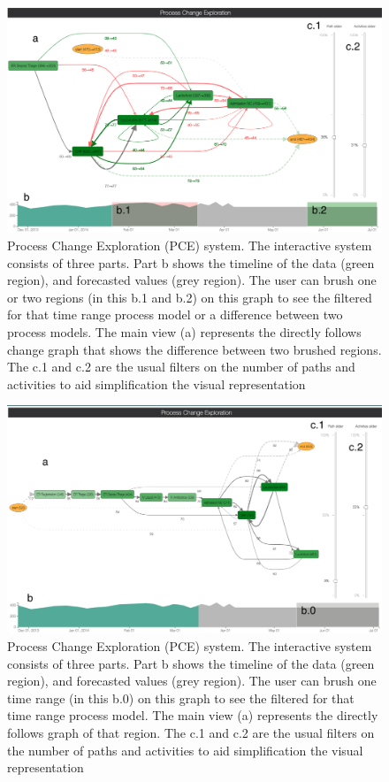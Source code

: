 \begin{figure}
	\centering
	\includegraphics[width=\textwidth]{img/vis/vis-system-two-brushes.png}
	\caption{Process Change Exploration (PCE) system. The interactive system consists of three parts. Part b shows the timeline of the data (green region), and forecasted values (grey region). The user can brush one or two regions (in this b.1 and b.2) on this graph to see the filtered for that time range process model or a difference between two process models. The main view (a) represents the directly follows change graph that shows the difference between two brushed regions. The c.1 and c.2 are the usual filters on the number of paths and activities to aid simplification the visual representation} 
	\label{fig:vis-two-brushes}
\end{figure}

\begin{figure}
	\centering
	\includegraphics[width=\textwidth]{img/vis/vis-system-one-brush.png}
	\caption{Process Change Exploration (PCE) system. The interactive system consists of three parts. Part b shows the timeline of the data (green region), and forecasted values (grey region). The user can brush one time range (in this b.0) on this graph to see the filtered for that time range process model. The main view (a) represents the directly follows graph of that region. The c.1 and c.2 are the usual filters on the number of paths and activities to aid simplification the visual representation} 
	\label{fig:vis-one-brushes}
\end{figure}


